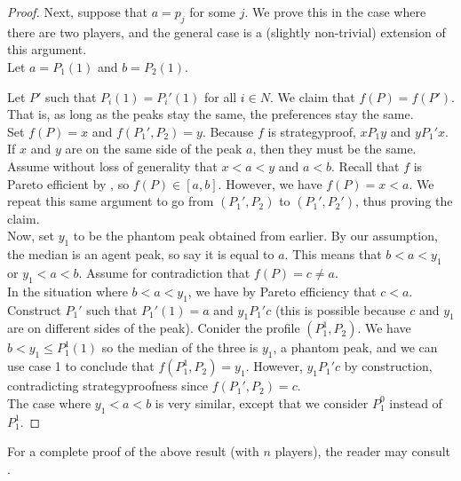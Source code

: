 \begin{proof}
			Next, suppose that $a = p_j$ for some $j$. We prove this in the case where there are two players, and the general case is a (slightly non-trivial) extension of this argument.\\
			Let $a = P_1(1)$ and $b = P_2(1)$. 

			Let $P'$ such that $P_i(1) = P_i'(1)$ for all $i \in N$. We claim that $f(P) = f(P')$. That is, as long as the peaks stay the same, the preferences stay the same.\\
			Set $f(P) = x$ and $f(P_1',P_2) = y$. Because $f$ is strategyproof, $x P_1 y$ and $y P_1' x$. If $x$ and $y$ are on the same side of the peak $a$, then they must be the same.\\
			Assume without loss of generality that $x < a < y$ and $a < b$. Recall that $f$ is Pareto efficient by , so $f(P) \in [a,b]$. However, we have $f(P) = x < a$. We repeat this same argument to go from $(P_1',P_2)$ to $(P_1',P_2')$, thus proving the claim.\\
			
			Now, set $y_1$ to be the phantom peak obtained from earlier. By our assumption, the median is an agent peak, so say it is equal to $a$. This means that $b < a < y_1$ or $y_1 < a < b$. Assume for contradiction that $f(P) = c \ne a$.\\
			In the situation where $b < a < y_1$, we have by Pareto efficiency that $c < a$. Construct $P_1'$ such that $P_1'(1) = a$ and $y_1 P_1' c$ (this is possible because $c$ and $y_1$ are on different sides of the peak). Conider the profile $(P_1^1,P_2)$. We have $b < y_1 \le P_1^1(1)$ so the median of the three is $y_1$, a phantom peak, and we can use case 1 to conclude that $f(P_1^1,P_2) = y_1$. However, $y_1 P_1' c$ by construction, contradicting strategyproofness since $f(P_1',P_2) = c$.\\
			The case where $y_1 < a < b$ is very similar, except that we consider $P_1^0$ instead of $P_1^1$.
		\end{proof}

		For a complete proof of the above result (with $n$ players), the reader may consult \cite{moulin-singlepeak}.
